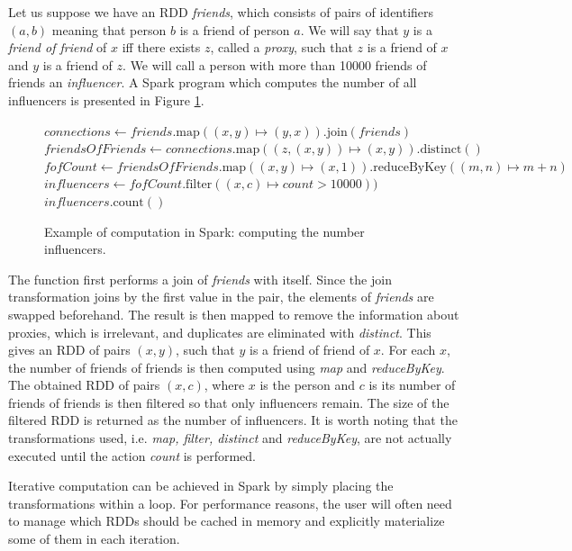 \begin{exmp}
Let us suppose we have an RDD \emph{friends}, which consists of pairs of identifiers $(a, b)$ meaning that person $b$ is a friend of person $a$. We will say that $y$ is a \emph{friend of friend} of $x$ iff there exists $z$, called a \emph{proxy}, such that $z$ is a friend of $x$ and $y$ is a friend of $z$. We will call a person with more than 10000 friends of friends an \emph{influencer}. A Spark program which computes the number of all influencers is presented in Figure \ref{ex:sparkfof}.

\begin{figure}[!htbp]
\begin{codebox}
  \li $\textit{connections} \leftarrow \textit{friends}.\text{map}((x, y) \mapsto (y, x)).\text{join}(\textit{friends})$
  \li $\textit{friendsOfFriends} \leftarrow \textit{connections}.\text{map}((z, (x, y)) \mapsto (x, y)).\text{distinct}()$ 
  \li $\textit{fofCount} \leftarrow \textit{friendsOfFriends}.\text{map}((x, y) \mapsto (x, 1)).\text{reduceByKey}((m, n) \mapsto m+n)$
  \li $\textit{influencers} \leftarrow \textit{fofCount}.\text{filter}((x, c) \mapsto count > 10000))$
  \li \Return $\textit{influencers}.\text{count}()$
\end{codebox}
\caption{Example of computation in Spark: computing the number influencers.}\label{ex:sparkfof}
\end{figure}

The  function first performs a join of \emph{friends} with itself. Since the join transformation joins by the first value in the pair, the elements of \emph{friends} are swapped beforehand. The result is then mapped to remove the information about proxies, which is irrelevant, and duplicates are eliminated with \emph{distinct}. This gives an RDD of pairs $(x, y)$, such that $y$ is a friend of friend of $x$. For each $x$, the number of friends of friends is then computed using \emph{map} and \emph{reduceByKey}. The obtained RDD of pairs $(x, c)$, where $x$ is the person and $c$ is its number of friends of friends is then filtered so that only influencers remain. The size of the filtered RDD is returned as the number of influencers. It is worth noting that the transformations used, i.e. \emph{map, filter, distinct} and \emph{reduceByKey}, are not actually executed until the action \emph{count} is performed.

Iterative computation can be achieved in Spark by simply placing the transformations within a loop. For performance reasons, the user will often need to manage which RDDs should be cached in memory and explicitly materialize some of them in each iteration.
\end{exmp}

